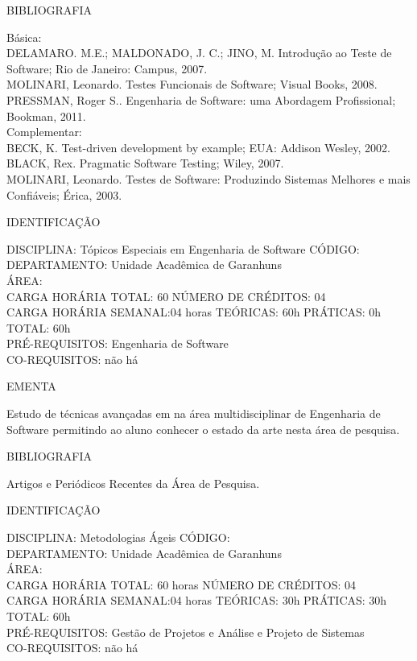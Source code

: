 \documentclass[
	12pt,				%
	openright,			%
  oneside,     %
	a4paper,			%
	chapter=TITLE,		%
	english,			%
	french,				%
	spanish,			%
	brazil				%
	]{abntex2}
\begin{document}
\begin{apendicesenv}
BIBLIOGRAFIA 

Básica:\\
DELAMARO. M.E.; MALDONADO, J. C.; JINO, M. Introdução ao Teste de
Software; Rio de Janeiro: Campus, 2007.\\
MOLINARI, Leonardo. Testes Funcionais de Software; Visual Books, 2008.\\
PRESSMAN, Roger S.. Engenharia de Software: uma Abordagem Profissional;
Bookman, 2011.\\
Complementar:\\
BECK, K. Test-driven development by example; EUA: Addison Wesley, 2002.\\
BLACK, Rex. Pragmatic Software Testing; Wiley, 2007.\\
MOLINARI, Leonardo. Testes de Software: Produzindo Sistemas Melhores e
mais Confiáveis; Érica, 2003.

\newpage IDENTIFICAÇÃO

DISCIPLINA: Tópicos Especiais em Engenharia de Software CÓDIGO: \\
DEPARTAMENTO: Unidade Acadêmica de Garanhuns\\
ÁREA: \\
CARGA HORÁRIA TOTAL: 60 NÚMERO DE CRÉDITOS: 04\\
CARGA HORÁRIA SEMANAL:04 horas TEÓRICAS: 60h PRÁTICAS: 0h TOTAL: 60h\\
PRÉ-REQUISITOS: Engenharia de Software\\
CO-REQUISITOS: não há

EMENTA 

Estudo de técnicas avançadas em na área multidisciplinar de Engenharia
de Software permitindo ao aluno conhecer o estado da arte nesta área de
pesquisa.

BIBLIOGRAFIA 

Artigos e Periódicos Recentes da Área de Pesquisa.

\newpage IDENTIFICAÇÃO

DISCIPLINA: Metodologias Ágeis CÓDIGO: \\
DEPARTAMENTO: Unidade Acadêmica de Garanhuns\\
ÁREA: \\
CARGA HORÁRIA TOTAL: 60 horas NÚMERO DE CRÉDITOS: 04\\
CARGA HORÁRIA SEMANAL:04 horas TEÓRICAS: 30h PRÁTICAS: 30h TOTAL: 60h\\
PRÉ-REQUISITOS: Gestão de Projetos e Análise e Projeto de Sistemas\\
CO-REQUISITOS: não há


\end{apendicesenv}
\end{document}
